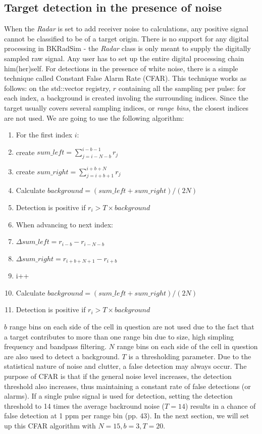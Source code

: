 \documentclass[letterpaper]{book}
\begin{document}
\subsection{Target detection in the presence of noise}
When the \textit{Radar} is set to add receiver noise to calculations, any positive signal cannot be classified to be of a target origin. There is no support for any digital processing in BKRadSim - the \textit{Radar} class is only meant to supply the digitally sampled raw signal. Any user has to set up the entire digital processing chain him(her)self. For detections in the presence of white noise, there is a simple technique called Constant False Alarm Rate (CFAR). This technique works as follows: on the std::vector registry, \(r\) containing all the sampling per pulse: for each index, a background is created involing the surrounding indices. Since the target usually covers several sampling indices, or \textit{range bins}, the closest indices are not used. We are going to use the following algorithm:
\begin{enumerate}
\item For the first index \(i\):
\item \quad create \(sum\_left = \sum_{j=i-N-b}^{i-b-1}{r_{j}}\)
\item \quad create \(sum\_right = \sum_{j=i+b+1}^{i+b+N}{r_{j}}\)
\item \quad Calculate \(background=(sum\_left + sum\_right) / (2N) \) 
\item \quad Detection is positive if \(r_{i} > T \times background \)
\item When advancing to next index:
\item \quad \(\Delta sum\_left = r_{i-b} - r_{i-N-b}\) 
\item \quad \(\Delta sum\_right = r_{i+b+N+1}-r_{i+b}\)
\item \quad i++
\item \quad Calculate  \(background=(sum\_left + sum\_right) / (2N) \) 
\item \quad Detection is positive if \(r_{i} > T \times background \)
\end{enumerate}
\(b\) range bins on each side of the cell in question are not used due to the fact that a target contributes to more than one range bin due to size, high simpling frequency and bandpass filtering. \(N\) range bins on each side of the cell in question are also used to detect a background. \(T\) is a thresholding parameter. Due to the statistical nature of noise and clutter, a false detection may always occur. The purpose of CFAR is that if the general noise level increases, the detection threshold also increases, thus maintaining a constant rate of false detections (or alarms). If a single pulse signal is used for detection, setting the detection threshold to 14 times the average backround noise (\(T = 14\)) results in a chance of false detection at 1 ppm per range bin \cite{ref:levanon} (pp. 43). In the next section, we will set up this CFAR algorithm with \(N=15, b=3, T=20\).
\end{document}
